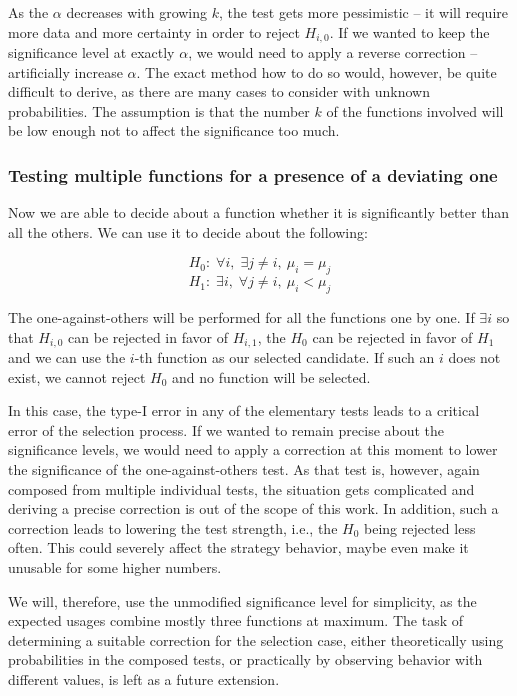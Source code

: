 As the $\alpha$ decreases with growing $k$, the test gets more pessimistic -- it will require more data and more certainty in order to reject $H_{i,0}$. If we wanted to keep the significance level at exactly $\alpha$, we would need to apply a reverse correction -- artificially increase $\alpha$. The exact method how to do so would, however, be quite difficult to derive, as there are many cases to consider with unknown probabilities. The assumption is that the number $k$ of the functions involved will be low enough not to affect the significance too much. 

\subsubsection{Testing multiple functions for a presence of a deviating one}

Now we are able to decide about a function whether it is significantly better than all the others. We can use it to decide about the following:

\[
H_0: \; \forall i,\; \exists j \neq i, \ \mu_i = \mu_j
\]
\[
H_1: \; \exists i,\; \forall j \neq i, \ \mu_i < \mu_j
\]

The one-against-others will be performed for all the functions one by one. If $\exists i$ so that $H_{i,0}$ can be rejected in favor of $H_{i, 1}$, the $H_0$ can be rejected in favor of $H_1$ and we can use the $i$-th function as our selected candidate. If such an $i$ does not exist, we cannot reject $H_0$ and no function will be selected.

 In this case, the type-I error in any of the elementary tests leads to a critical error of the selection process. If we wanted to remain precise about the significance levels, we would need to apply a correction at this moment to lower the significance of the one-against-others test. As that test is, however, again composed from multiple individual tests, the situation gets complicated and deriving a precise correction is out of the scope of this work. In addition, such a correction leads to lowering the test strength, i.e., the $H_0$ being rejected less often. This could severely affect the strategy behavior, maybe even make it unusable for some higher numbers.
 
 We will, therefore, use the unmodified significance level for simplicity, as the expected usages combine mostly three functions at maximum. The task of determining a suitable correction for the selection case, either theoretically using probabilities in the composed tests, or practically by observing behavior with different values, is left as a future extension.

